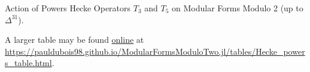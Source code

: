 \begin{center}
Action of Powers Hecke Operators $T_3$ and $T_5$ on Modular Forms Modulo 2 (up to $\Delta^{31}$).
\end{center}
A larger table may be found \href{https://pauldubois98.github.io/ModularFormsModuloTwo.jl/tables/Hecke_powers_table.html}{online} at \url{https://pauldubois98.github.io/ModularFormsModuloTwo.jl/tables/Hecke_powers_table.html}.




